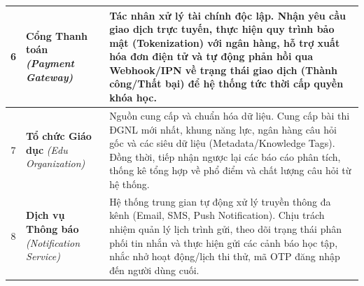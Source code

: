 \begin{longtable}{|c|p{3.8cm}|p{9.5cm}|}
	6 & \textbf{Cổng Thanh toán} \newline \textit{(Payment Gateway)} & Tác nhân xử lý tài chính độc lập. Nhận yêu cầu giao dịch trực tuyến, thực hiện quy trình bảo mật (Tokenization) với ngân hàng, hỗ trợ xuất hóa đơn điện tử và tự động phản hồi qua Webhook/IPN về trạng thái giao dịch (Thành công/Thất bại) để hệ thống tức thời cấp quyền khóa học. \\ \hline
	7 & \textbf{Tổ chức Giáo dục} \newline \textit{(Edu Organization)} & Nguồn cung cấp và chuẩn hóa dữ liệu. Cung cấp bài thi ĐGNL mới nhất, khung năng lực, ngân hàng câu hỏi gốc và các siêu dữ liệu (Metadata/Knowledge Tags). Đồng thời, tiếp nhận ngược lại các báo cáo phân tích, thống kê tổng hợp về phổ điểm và chất lượng câu hỏi từ hệ thống. \\ \hline
	8 & \textbf{Dịch vụ Thông báo} \newline \textit{(Notification Service)} & Hệ thống trung gian tự động xử lý truyền thông đa kênh (Email, SMS, Push Notification). Chịu trách nhiệm quản lý lịch trình gửi, theo dõi trạng thái phân phối tin nhắn và thực hiện gửi các cảnh báo học tập, nhắc nhở hoạt động/lịch thi thử, mã OTP đăng nhập đến người dùng cuối. \\ \hline
\end{longtable}